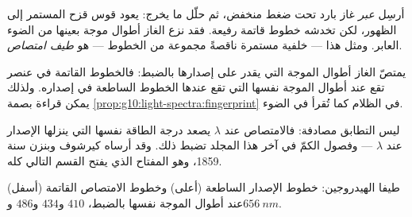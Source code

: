 \begin{definition}\label{def:g10:light-spectra:absorption}
أرسِل  \emph{عبر} غاز بارد تحت ضغط منخفض، ثم حلّل
ما يخرج: يعود قوس قزح المستمر إلى الظهور، لكن تخدشه خطوط قاتمة
رفيعة. فقد نزع الغاز أطوال موجة بعينها من الضوء العابر.
ومثل هذا  --- خلفية مستمرة ناقصةً مجموعة من الخطوط --- هو
\emph{طيف امتصاص}.
\end{definition}

\begin{proposition}\label{prop:g10:light-spectra:kirchhoff}
يمتصّ الغاز أطوال الموجة التي يقدر على إصدارها بالضبط: فالخطوط القاتمة
في  عنصر تقع عند أطوال الموجة نفسها التي تقع عندها
الخطوط الساطعة في  إصداره. ولذلك يمكن قراءة بصمة
\cref{prop:g10:light-spectra:fingerprint} في الظلام كما تُقرأ في
الضوء.
\end{proposition}
\admitted

\begin{remark}\label{rem:g10:light-spectra:mechanism}
ليس التطابق مصادفة: فالامتصاص عند $\lambda$ يصعد درجة الطاقة
نفسها التي ينزلها الإصدار عند $\lambda$ --- وفصول الكمّ
في آخر هذا المجلد تضبط ذلك. وقد أرساه كيرشوف
وبنزن سنة 1859، وهو المفتاح الذي يفتح القسم التالي كله.
\end{remark}

\begin{omfigure}

{\small طيفا الهيدروجين: خطوط الإصدار الساطعة (أعلى) وخطوط
الامتصاص القاتمة (أسفل) عند أطوال الموجة نفسها بالضبط، $410$ و$434$
و$486$ و$\qty{656}{nm}$.}
\end{omfigure}

